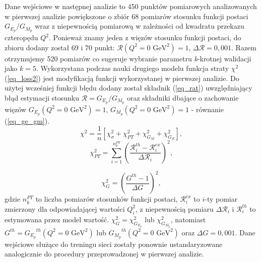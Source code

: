 \documentclass[11pt]{book}
\theoremstyle{definition}
\begin{document}
%
Dane wejściowe w następnej analizie to 450 punktów pomiarowych analizowanych w pierwszej analizie powiększone o zbiór 68 pomiarów stosunku funkcji postaci $G_{E_p}/G_{M_p}$ wraz z niepewnością pomiarową w zależności od kwadratu przekazu czteropędu $Q^2$. Ponieważ znamy jeden z więzów stosunku funkcji postaci, do zbioru dodany został 69 i 70 punkt: $\mathcal{R}\left(Q^2 = 0 \text{ GeV}^2\right) = 1$, $\Delta \mathcal{R} = 0,001$. Razem otrzymujemy 520 pomiarów co sugeruje wybranie parametru \textit{k}-krotnej walidacji jako $k=5$.
%
Wykorzystana podczas nauki drugiego modelu funkcja straty $\chi^2$ (\ref{eq_loss2}) jest modyfikacją funkcji wykorzystanej w pierwszej analizie. Do użytej wcześniej funkcji błędu dodany został składnik (\ref{eq_rat}) uwzględniający błąd estymacji stosunku $\mathcal{R} = G_{E_p}/G_{M_p}$ oraz składniki dbające o zachowanie więzów $G_{E_p}\left(Q^2=0\text{ GeV}^2\right) = 1$, $G_{M_p}\left(Q^2=0\text{ GeV}^2\right) = 1$ - równanie (\ref{eq_ge_gm}).
%
\begin{equation}
\chi^2 = \frac{1}{n} \left[ \chi_{\sigma}^2 + \chi_{PT}^2 + \chi_{G_M}^2  + \chi_{G_E}^2  \right], \label{eq_loss2}
\end{equation}
%
\begin{equation}
\chi_{PT}^2 = \sum_{i=1}^{n_k^{PT}} \left( \frac{\mathcal{R}_i^{th} - \mathcal{R}_i^{ex}}{\Delta \mathcal{R}_{i}} \right)^2, \label{eq_rat}
\end{equation}

\begin{equation}
\chi_{G}^2 =  \left( \frac{G^{th} - 1}{\Delta G} \right)^2, \label{eq_ge_gm}
\end{equation}
%
gdzie $n_k^{PT}$ to liczba pomiarów stosunków funkcji postaci, $\mathcal{R}_i^{ex}$ to $i$-ty pomiar zmierzony dla odpowiadającej wartości $Q_i^2$, z niepewnością pomiaru $\Delta \mathcal{R}_{i}$ i $\mathcal{R}_i^{th}$ to estymowana przez model wartość. $\chi_{G}^2 = \chi_{G_{E_p}}^2$ lub $\chi_{G_{M_p}}^2 $, natomiast $G^{th} = {G_{E_p}}^{th}\left(Q^2=0\text{ GeV}^2\right)$ lub ${G_{M_p}}^{th}\left(Q^2=0\text{ GeV}^2\right)$ oraz $\Delta {G} = 0,001$. Dane wejściowe służące do treningu sieci zostały ponownie ustandaryzowane analogicznie do procedury przeprowadzonej w pierwszej analizie.
\end{document}

